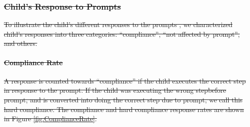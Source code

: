 \documentclass{ut-thesis}
\providecommand{\DIFdeltex}[1]{{\protect\color{red}\sout{#1}}}                      %
\providecommand{\DIFdelbegin}{} %
\providecommand{\DIFdel}[1]{\texorpdfstring{\DIFdeltex{#1}}{}} %
\begin{document}
\DIFdelbegin \subsubsection{\DIFdel{Child's Response to Prompts}}
\addtocounter{subsubsection}{-1}%
\DIFdel{To illustrate the child's different responses to the prompts , we characterized child's responses into three categories: ``compliance'', ``not affected by prompt'', and others.  }%

\paragraph{\DIFdel{Compliance Rate}}
\addtocounter{paragraph}{-1}%
\DIFdel{A response is counted towards ``compliance'' if the child executes the correct step in response to the prompt.  If the child was executing the wrong stepbefore prompt, and is converted into doing the correct step due to prompt, we call this hard compliance.  The compliance and hard compliance response rates are shown in Figure \ref{fig:ComplianceRate}.
}%
\end{document}
